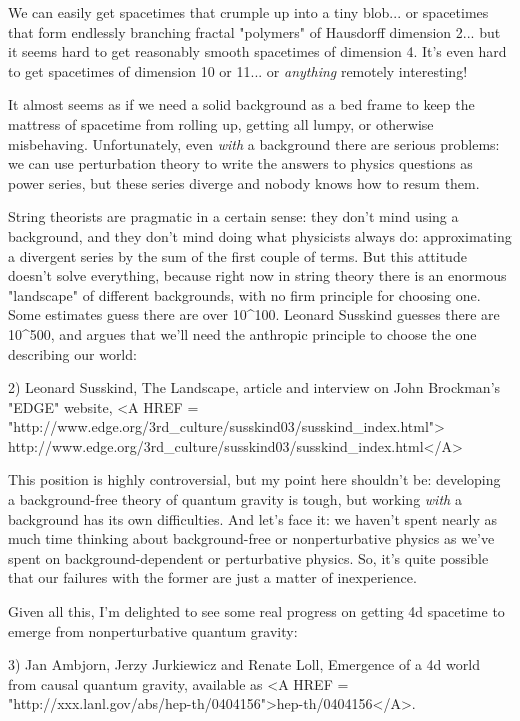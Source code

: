 We can easily get spacetimes that crumple up into a tiny blob... or 
spacetimes that form endlessly branching fractal "polymers" of 
Hausdorff 
dimension 2... but it seems hard to get reasonably smooth spacetimes of 
dimension 4.  It's even hard to get spacetimes of dimension 10 or 11...
or \emph{anything} remotely interesting!

It almost seems as if we need a solid background as a bed frame to keep 
the mattress of spacetime from rolling up, getting all lumpy, or 
otherwise misbehaving.  
Unfortunately, even \emph{with} a background there are serious problems: we 
can use perturbation theory to write the answers to physics questions as 
power series, but these series diverge and nobody knows how to resum them.

String theorists are pragmatic in a certain sense: they don't mind using 
a background, and they don't mind doing what physicists always do: 
approximating a divergent series by the sum of the first couple of terms.
But this attitude doesn't solve everything, because right now in string 
theory there is an enormous "landscape" of different backgrounds, with no 
firm principle for choosing one.  Some estimates guess there are over 
10^{100}.  Leonard Susskind guesses there are 10^{500}, 
and argues that 
we'll need the anthropic principle to choose the one describing our
world:

2) Leonard Susskind, The Landscape, article and interview on John
Brockman's "EDGE" website, 
<A HREF = "http://www.edge.org/3rd_culture/susskind03/susskind_index.html">
http://www.edge.org/3rd_culture/susskind03/susskind_index.html</A>

This position is highly controversial, but my point here shouldn't be: 
developing a background-free theory of quantum gravity is tough, but
working \emph{with} a background has its own difficulties.  And let's face
it: we haven't spent nearly as much time thinking about background-free
or nonperturbative physics as we've spent on background-dependent 
or perturbative physics.   So, it's quite possible that our failures
with the former are just a matter of inexperience.

Given all this, I'm delighted to see some real progress on getting 4d
spacetime to emerge from nonperturbative quantum gravity:

3) Jan Ambjorn, Jerzy Jurkiewicz and Renate Loll, Emergence of a 4d world 
from causal quantum gravity, available as 
<A HREF = "http://xxx.lanl.gov/abs/hep-th/0404156">hep-th/0404156</A>.


